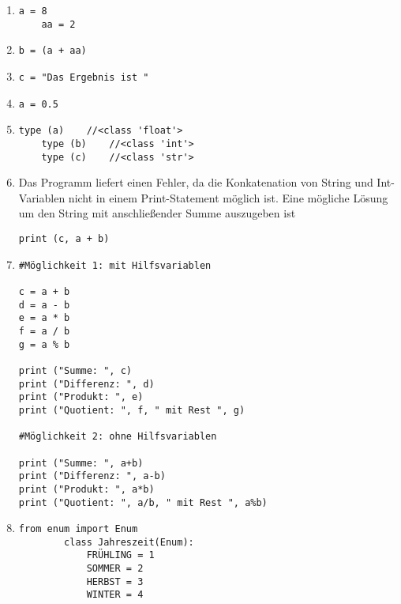 \begin{enumerate}

\item \begin{lstlisting}[label=datatypesSolutionA]
    a = 8
    aa = 2
\end{lstlisting}

\item \begin{lstlisting}[label=datatypesSolutionB]
    b = (a + aa)
\end{lstlisting}

\item \begin{lstlisting}[label=datatypesSolutionC]
    c = "Das Ergebnis ist "
\end{lstlisting}

\item \begin{lstlisting}[label=datatypesSolutionD]
    a = 0.5
\end{lstlisting}

\item \begin{lstlisting}[label=datatypesSolutionE]
    type (a)    //<class 'float'>
    type (b)    //<class 'int'>
    type (c)    //<class 'str'>
\end{lstlisting}

\item     Das Programm liefert einen Fehler, da die
    Konkatenation von String und Int-Variablen nicht in einem Print-Statement möglich ist. Eine mögliche Lösung um den String mit anschließender Summe auszugeben ist
\begin{lstlisting}[label=datatypesSolutionF]
    print (c, a + b)
\end{lstlisting}

\item \begin{lstlisting}[label=datatypesSolutionG]
#Möglichkeit 1: mit Hilfsvariablen

c = a + b
d = a - b
e = a * b
f = a / b
g = a % b

print ("Summe: ", c)
print ("Differenz: ", d)
print ("Produkt: ", e)
print ("Quotient: ", f, " mit Rest ", g)

#Möglichkeit 2: ohne Hilfsvariablen

print ("Summe: ", a+b)
print ("Differenz: ", a-b)
print ("Produkt: ", a*b)
print ("Quotient: ", a/b, " mit Rest ", a%b)
\end{lstlisting} 

\item \begin{lstlisting}[label=datatypesSolutionH]
	from enum import Enum
		class Jahreszeit(Enum):
    		FRÜHLING = 1
   			SOMMER = 2
    		HERBST = 3
    		WINTER = 4
\end{lstlisting} 

\end{enumerate}
